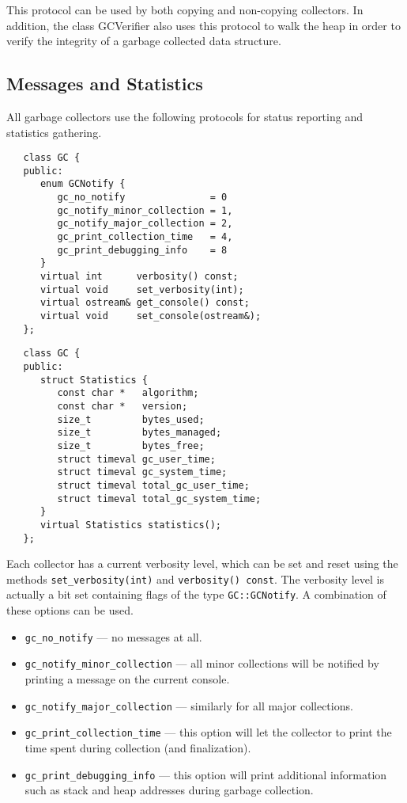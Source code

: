 This protocol can be used by both copying and non-copying collectors.
In addition, the class {\sf GCVerifier} also uses this protocol to 
walk the heap in order to verify the integrity of a garbage collected 
data structure.

\subsection{Messages and Statistics}
    All garbage collectors use the following protocols for status
reporting and statistics gathering.  
  
\begin{verbatim}
   class GC {
   public:
      enum GCNotify {
         gc_no_notify               = 0
         gc_notify_minor_collection = 1,
         gc_notify_major_collection = 2,
         gc_print_collection_time   = 4,
         gc_print_debugging_info    = 8
      }
      virtual int      verbosity() const;
      virtual void     set_verbosity(int);
      virtual ostream& get_console() const;
      virtual void     set_console(ostream&);
   };
\end{verbatim}

\begin{verbatim}
   class GC {
   public:
      struct Statistics {
         const char *   algorithm;
         const char *   version;
         size_t         bytes_used;
         size_t         bytes_managed;
         size_t         bytes_free;
         struct timeval gc_user_time;
         struct timeval gc_system_time;
         struct timeval total_gc_user_time;
         struct timeval total_gc_system_time;
      }
      virtual Statistics statistics();
   };
\end{verbatim}

    Each collector has a current verbosity level, which can be set
and reset using the methods \verb|set_verbosity(int)| and
\verb|verbosity() const|.  The verbosity level is actually a bit
set containing flags of the type \verb|GC::GCNotify|.  A combination
of these options can be used.
\begin{itemize}
  \item \verb|gc_no_notify| --- no messages at all.
  \item \verb|gc_notify_minor_collection| --- all minor collections
    will be notified by printing a message on the current console.
  \item \verb|gc_notify_major_collection| --- similarly for all major
    collections.
  \item \verb|gc_print_collection_time| --- this option will let the
    collector to print the time spent during collection (and finalization).
  \item \verb|gc_print_debugging_info| --- this option will print additional
    information such as stack and heap addresses during garbage collection.
\end{itemize}

